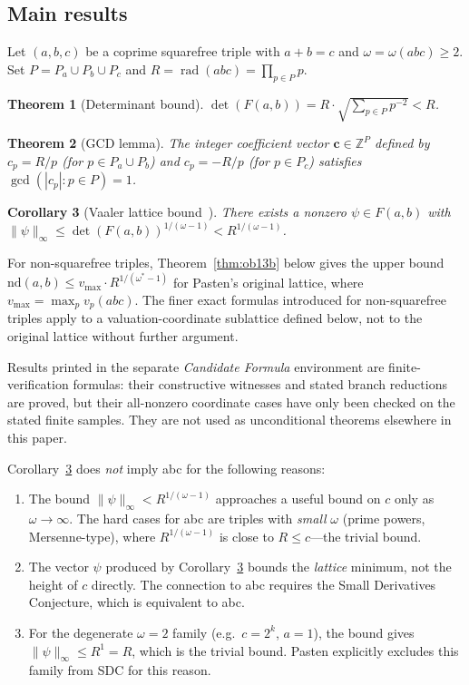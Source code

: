 \documentclass[12pt]{article}
\newtheorem{theorem}{Theorem}
\newtheorem{corollary}[theorem]{Corollary}
\theoremstyle{definition}
\DeclareMathOperator{\rad}{rad}
\begin{document}
\subsection{Main results}

Let $(a,b,c)$ be a coprime squarefree triple with $a+b=c$ and
$\omega = \omega(abc) \ge 2$.  Set $P = P_a \cup P_b \cup P_c$ and
$R = \rad(abc) = \prod_{p \in P} p$.

\begin{theorem}[Determinant bound]\label{thm:det}
  $\det(F(a,b)) = R \cdot \sqrt{\sum_{p \in P} p^{-2}} < R$.
\end{theorem}

\begin{theorem}[GCD lemma]\label{thm:gcd}
  The integer coefficient vector $\mathbf{c} \in \mathbb{Z}^P$ defined by
  $c_p = R/p$ (for $p \in P_a \cup P_b$) and $c_p = -R/p$ (for $p \in P_c$)
  satisfies $\gcd(|c_p| : p \in P) = 1$.
\end{theorem}

\begin{corollary}[Vaaler lattice bound~{\cite{Vaaler1979}}]\label{cor:minkowski}
  There exists a nonzero $\psi \in F(a,b)$ with
  $\|\psi\|_\infty \le \det(F(a,b))^{1/(\omega-1)} < R^{1/(\omega-1)}$.
\end{corollary}

For non-squarefree triples, Theorem~\ref{thm:ob13b} below gives the upper bound
$\mathrm{nd}(a,b) \le v_{\max} \cdot R^{1/(\omega^*-1)}$ for Pasten's original
lattice, where $v_{\max} = \max_{p} v_p(abc)$.
The finer exact formulas introduced for non-squarefree triples apply to a
valuation-coordinate sublattice defined below, not to the original lattice
without further argument.

Results printed in the separate \emph{Candidate Formula} environment are
finite-verification formulas: their constructive witnesses and stated branch
reductions are proved, but their all-nonzero coordinate cases have only been
checked on the stated finite samples.  They are not used as unconditional
theorems elsewhere in this paper.



Corollary~\ref{cor:minkowski} does \emph{not} imply abc for the following reasons:
\begin{enumerate}
  \item The bound $\|\psi\|_\infty < R^{1/(\omega-1)}$ approaches a useful
    bound on $c$ only as $\omega \to \infty$.  The hard cases for abc are
    triples with \emph{small} $\omega$ (prime powers, Mersenne-type), where
    $R^{1/(\omega-1)}$ is close to $R \le c$---the trivial bound.
  \item The vector $\psi$ produced by Corollary~\ref{cor:minkowski} bounds
    the \emph{lattice} minimum, not the height of $c$ directly.  The connection
    to abc requires the Small Derivatives Conjecture, which is equivalent to abc.
  \item For the degenerate $\omega=2$ family (e.g.\ $c = 2^k$, $a=1$),
    the bound gives $\|\psi\|_\infty \le R^1 = R$, which is the trivial bound.
    Pasten explicitly excludes this family from SDC for this reason.
\end{enumerate}
\end{document}
